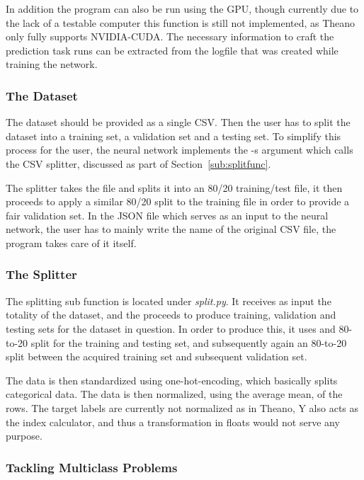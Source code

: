 \documentclass[12pt]{article}
\begin{document}
In addition the program can also be run using the GPU, though currently due to the lack of a testable computer this function is still not implemented, as Theano only fully supports NVIDIA-CUDA\@. The necessary  information to craft the prediction task runs can be extracted from the logfile that was created while training the network.

\subsubsection{The Dataset}
\label{subsub:dataset}

The dataset should be provided as a single CSV\@. Then the user has to split the dataset into a training set, a validation set and a testing set. To simplify this process for the user, the neural network implements the -s argument which calls the CSV splitter, discussed as part of Section~\ref{sub:splitfunc}. 

The splitter takes the file and splits it into an 80/20 training/test file, it then proceeds to apply a similar 80/20 split to the training file in order to provide a fair validation set. In the JSON file which serves as an input to the neural network, the user has to mainly write the name of the original CSV file, the program takes care of it itself.

\subsubsection{The Splitter}
\label{subsub:splitter}

The splitting sub function is located under \emph{split.py}. It receives as input the totality of the dataset, and the proceeds to produce training, validation and testing sets for the dataset in question. In order to produce this, it uses and 80-to-20 split for the training and testing set, and subsequently again an 80-to-20 split between the acquired training set and subsequent validation set.

The data is then standardized using one-hot-encoding, which basically splits categorical data. The data is then normalized, using the average mean, of the rows. The target labels are currently not normalized as in Theano, Y also acts as the index calculator, and thus a transformation in floats would not serve any purpose.

\subsubsection{Tackling Multiclass Problems}
\label{subsub:multiclass_problem}
\end{document}
